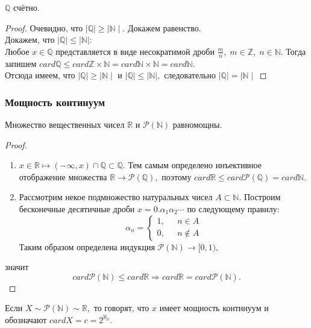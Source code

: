 \begin{Proposition}
$\mathbb{Q}$ счётно.
\end{Proposition}
\begin{proof}
Очевидно, что $\mid\mathbb{Q}\mid \geq\mid\mathbb{N}\mid.$ Докажем равенство.\\
Докажем, что $\mid\mathbb{Q}\mid \leq\mid\mathbb{N}\mid:$ \\
Любое $x\in\mathbb{Q}$ представляется в виде несократимой дроби $\frac{m}{n}, \; m\in\mathbb{Z}, \; n\in\mathbb{N}.$ Тогда запишем $card\mathbb{Q}\leq card\mathbb{Z}\times\mathbb{N} = card\mathbb{N}\times\mathbb{N}=card\mathbb{N}.$\\
Отсюда имеем, что $\mid\mathbb{Q}\mid \geq\mid\mathbb{N}\mid$ и $\mid\mathbb{Q}\mid \leq\mid\mathbb{N}\mid,$ следовательно $\mid\mathbb{Q}\mid =\mid\mathbb{N}\mid$
\end{proof}

\subsubsection{Мощность континуум}
\begin{Proposition}
Множество вещественных чисел $\mathbb{R}$ и $\mathcal{P}(\mathbb{N})$ равномощны.
\end{Proposition}
\begin{proof}
\begin{enumerate}
\item $x\in\mathbb{R} \longmapsto (-\infty, x)\cap\mathbb{Q} \subset \mathbb{Q}.$ Тем самым определено инъективное отображение множества $\mathbb{R} \rightarrow\mathcal{P}(\mathbb{Q}),$ поэтому $card\mathbb{R}\leq card\mathcal{P}(\mathbb{Q})=card\mathbb{N}.$
\item Рассмотрим некое подмножество натуральных чисел $A\subset\mathbb{N}.$ Построим бесконечные десятичные дроби $x=0.\alpha_1\alpha_2\cdots$ по следующему правилу:
\begin{equation*}
\alpha_n = 
 \begin{cases}
   1, &\text{ $n\in A $}\\
   0, &\text{ $n\notin A$}
 \end{cases}
\end{equation*}
Таким образом определена индукция $\mathcal{P}(\mathbb{N}) \rightarrow [0, 1),$ 
\end{enumerate} 
значит $$card\mathcal{P}(\mathbb{N})\leq card\mathbb{R} \Rightarrow card\mathbb{R}= card\mathcal{P}(\mathbb{N}).$$
\end{proof}

\begin{Definition}
Если $X\sim\mathcal{P}(\mathbb{N})\sim\mathbb{R},$ то говорят, что $x$ имеет мощность континуум и обозначают $cardX=c=2^{\aleph_0}.$
\end{Definition}
